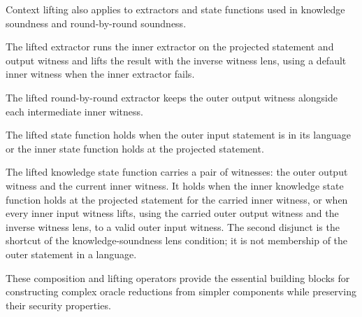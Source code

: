 Context lifting also applies to extractors and state functions used in knowledge soundness and round-by-round soundness.

\begin{definition}
    \label{def:straightline_extractor_lift_context}
    The lifted extractor runs the inner extractor on the projected statement and output witness
    and lifts the result with the inverse witness lens, using a default inner witness when the
    inner extractor fails.
    \leanok
\end{definition}

\begin{definition}
    \label{def:rbr_extractor_lift_context}
    The lifted round-by-round extractor keeps the outer output witness alongside each intermediate
    inner witness.
    \leanok
\end{definition}

\begin{definition}
    \label{def:state_function_lift_context}
    The lifted state function holds when the outer input statement is in its language or the inner
    state function holds at the projected statement.

    The lifted knowledge state function carries a pair of witnesses: the outer output witness and
    the current inner witness. It holds when the inner knowledge state function holds at the
    projected statement for the carried inner witness, or when every inner input witness lifts,
    using the carried outer output witness and the inverse witness lens, to a valid outer input
    witness. The second disjunct is the shortcut of the knowledge-soundness lens condition; it is
    not membership of the outer statement in a language.
    \leanok
\end{definition}

These composition and lifting operators provide the essential building blocks for constructing complex oracle reductions from simpler components while preserving their security properties.
